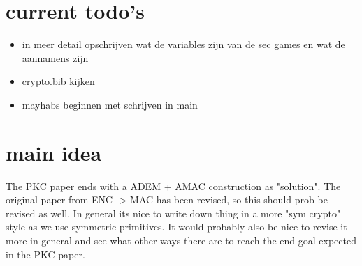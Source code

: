 \documentclass{article}
\begin{document}
\newpage
\section{current todo's}
\begin{itemize}
    \item in meer detail opschrijven wat de variables zijn van de sec games en wat de aannamens zijn
    \item crypto.bib kijken
    \item mayhabs beginnen met schrijven in main
\end{itemize}
\newpage
\section{main idea}
The PKC paper ends with a ADEM + AMAC construction as "solution". The original paper from ENC -> MAC has been revised, so this should prob be revised as well. In general its nice to write down thing in a more "sym crypto" style as we use symmetric primitives. It would probably also be nice to revise it more in general and see what other ways there are to reach the end-goal expected in the PKC paper.
\end{document}
